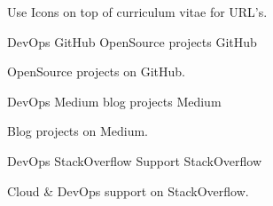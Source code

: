 

\begin{cventries}

  \cventry
    {Use Icons on top of curriculum vitae for URL's.}
    {} %
    {} %
    {} %
    {}

  \cventry
    {DevOps} %
    {GitHub OpenSource projects} %
    {GitHub} %
    {} %
    {
      \begin{cvitems} %
        \item {OpenSource projects on GitHub.}
      \end{cvitems}
    }

  \cventry
    {DevOps} %
    {Medium blog projects} %
    {Medium} %
    {} %
    {
      \begin{cvitems} %
        \item {Blog projects on Medium.}
      \end{cvitems}
    }

  \cventry
    {DevOps} %
    {StackOverflow Support} %
    {StackOverflow} %
    {} %
    {
      \begin{cvitems} %
        \item {Cloud \& DevOps support on StackOverflow.}
      \end{cvitems}
    }

\end{cventries}

